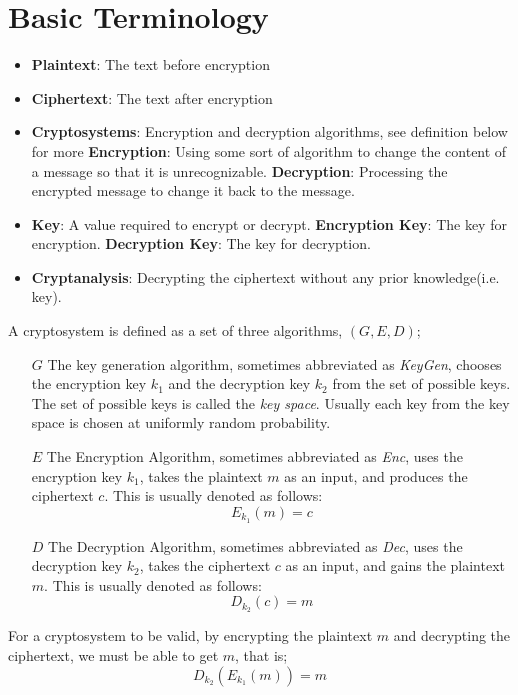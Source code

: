 \documentclass{report}
\begin{document}
	\section{Basic Terminology}
		\begin{defn}
			\begin{itemize}
				\item[]
				\item \textbf{Plaintext}: The text before encryption
				\item \textbf{Ciphertext}: The text after encryption
				\item \textbf{Cryptosystems}: Encryption and decryption algorithms, see definition below for more
				\subitem \textbf{Encryption}: Using some sort of algorithm to change the content of a message so that it is unrecognizable.
				\subitem \textbf{Decryption}: Processing the encrypted message to change it back to the message.
				\item \textbf{Key}: A value required to encrypt or decrypt.
				\subitem \textbf{Encryption Key}: The key for encryption.
				\subitem \textbf{Decryption Key}: The key for decryption.
				\item \textbf{Cryptanalysis}: Decrypting the ciphertext without any prior knowledge(i.e. key).
			\end{itemize}
		\end{defn}
		
		\begin{defn}[Cryptosystem]
			A cryptosystem is defined as a set of three algorithms, $(G,E,D)$;
			\begin{itemize}
				\item[$G$]
				\subitem The key generation algorithm, sometimes abbreviated as \emph{KeyGen}, chooses the encryption key $k_1$ and the decryption key $k_2$ from the set of possible keys. The set of possible keys is called the \emph{key space}. Usually each key from the key space is chosen at uniformly random probability.
				\item[$E$]
				\subitem The Encryption Algorithm, sometimes abbreviated as \emph{Enc}, uses the encryption key $k_1$, takes the plaintext $m$ as an input, and produces the ciphertext $c$. This is usually denoted as follows:
				\begin{displaymath}
					E_{k_1}(m)=c
				\end{displaymath}
				\item[$D$]
				\subitem The Decryption Algorithm, sometimes abbreviated as \emph{Dec}, uses the decryption key $k_2$, takes the ciphertext $c$ as an input, and gains the plaintext $m$. This is usually denoted as follows:
				\begin{displaymath}
					D_{k_2}(c)=m
				\end{displaymath}
			\end{itemize}
			For a cryptosystem to be valid, by encrypting the plaintext $m$ and decrypting the ciphertext, we must be able to get $m$, that is;
			\begin{displaymath}
				D_{k_2}(E_{k_1}(m))=m
			\end{displaymath}
		\end{defn}
		
\end{document}

